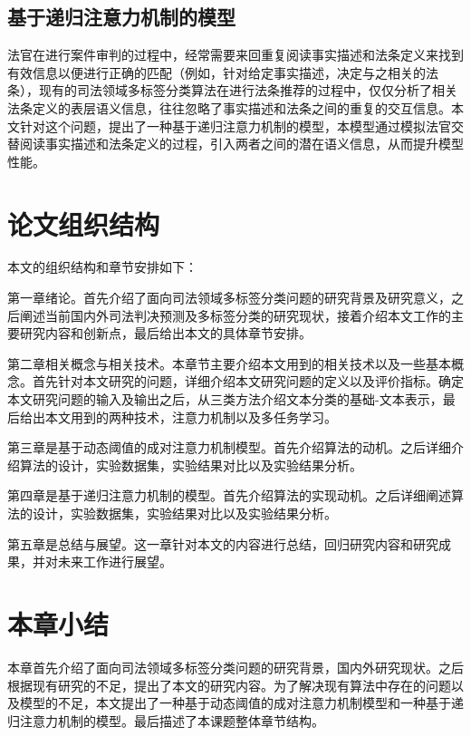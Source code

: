 \subsection{基于递归注意力机制的模型}
法官在进行案件审判的过程中，经常需要来回重复阅读事实描述和法条定义来找到有效信息以便进行正确的匹配（例如，针对给定事实描述，决定与之相关的法条），现有的司法领域多标签分类算法在进行法条推荐的过程中，仅仅分析了相关法条定义的表层语义信息，往往忽略了事实描述和法条之间的重复的交互信息。本文针对这个问题，提出了一种基于递归注意力机制的模型，本模型通过模拟法官交替阅读事实描述和法条定义的过程，引入两者之间的潜在语义信息，从而提升模型性能。
\section{论文组织结构}
本文的组织结构和章节安排如下：

第一章绪论。首先介绍了面向司法领域多标签分类问题的研究背景及研究意义，之后阐述当前国内外司法判决预测及多标签分类的研究现状，接着介绍本文工作的主要研究内容和创新点，最后给出本文的具体章节安排。

第二章相关概念与相关技术。本章节主要介绍本文用到的相关技术以及一些基本概念。首先针对本文研究的问题，详细介绍本文研究问题的定义以及评价指标。确定本文研究问题的输入及输出之后，从三类方法介绍文本分类的基础-文本表示，最后给出本文用到的两种技术，注意力机制以及多任务学习。

第三章是基于动态阈值的成对注意力机制模型。首先介绍算法的动机。之后详细介绍算法的设计，实验数据集，实验结果对比以及实验结果分析。

第四章是基于递归注意力机制的模型。首先介绍算法的实现动机。之后详细阐述算法的设计，实验数据集，实验结果对比以及实验结果分析。

第五章是总结与展望。这一章针对本文的内容进行总结，回归研究内容和研究成果，并对未来工作进行展望。


\section{本章小结}
本章首先介绍了面向司法领域多标签分类问题的研究背景，国内外研究现状。之后根据现有研究的不足，提出了本文的研究内容。为了解决现有算法中存在的问题以及模型的不足，本文提出了一种基于动态阈值的成对注意力机制模型和一种基于递归注意力机制的模型。最后描述了本课题整体章节结构。


